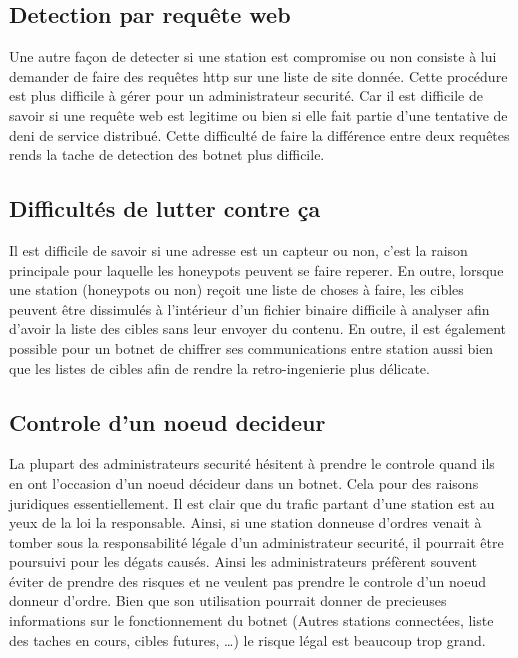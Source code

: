\subsection{Detection par requête web}

Une autre façon de detecter si une station est compromise ou non consiste à lui demander de faire
des requêtes http sur une liste de site donnée. Cette procédure est plus difficile à gérer pour un administrateur
securité. Car il est difficile de savoir si une requête web est legitime ou bien si elle fait partie d'une tentative
de deni de service distribué. Cette difficulté de faire la différence entre deux requêtes rends
la tache de detection des botnet plus difficile.


\subsection{Difficultés de lutter contre ça}

Il est difficile de savoir si une adresse est un capteur ou non, c'est la raison principale pour laquelle
les honeypots peuvent se faire reperer.
En outre, lorsque une station (honeypots ou non) reçoit une liste de choses à faire, les cibles peuvent
être dissimulés à l'intérieur d'un fichier binaire difficile à analyser afin d'avoir la liste des cibles sans
leur envoyer du contenu. En outre, il est également possible pour un botnet de chiffrer ses communications entre
station aussi bien que les listes de cibles afin de rendre la retro-ingenierie plus délicate.

\subsection{Controle d'un noeud decideur}

La plupart des administrateurs securité hésitent à prendre le controle quand ils en ont l'occasion d'un
noeud décideur dans un botnet. Cela pour des raisons juridiques essentiellement. Il est clair que du trafic
partant d'une station est au yeux de la loi la responsable. Ainsi, si une station donneuse d'ordres venait à tomber
sous la responsabilité légale d'un administrateur securité, il pourrait être poursuivi pour les dégats causés.
Ainsi les administrateurs préfèrent souvent éviter de prendre des risques et ne veulent pas prendre le controle d'un
noeud donneur d'ordre. Bien que son utilisation pourrait donner de precieuses informations sur le fonctionnement du botnet
(Autres stations connectées, liste des taches en cours, cibles futures, \ldots) le risque légal est beaucoup trop
grand.
